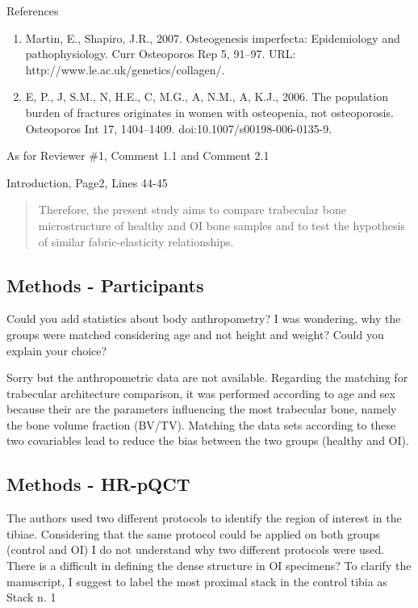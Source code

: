 \documentclass{AR2RC}
\begin{document}
References\vspace{-1em}
\begin{enumerate}
	\item Martin, E., Shapiro, J.R., 2007. Osteogenesis imperfecta: Epidemiology and pathophysiology. Curr Osteoporos Rep 5, 91–97. URL: http://www.le.ac.uk/genetics/collagen/.
	\item E, P., J, S.M., N, H.E., C, M.G., A, N.M., A, K.J., 2006. The population burden of fractures originates in women with osteopenia, not osteoporosis. Osteoporos Int 17, 1404–1409. doi:10.1007/s00198-006-0135-9.
\end{enumerate}

As for Reviewer \#1, Comment 1.1 and Comment 2.1\par

Introduction, Page2, Lines 44-45
\begin{quote}
	Therefore, the present study aims to compare trabecular bone microstructure of healthy and OI bone samples and to test the hypothesis of similar fabric-elasticity relationships.
\end{quote}


\subsection{Methods - Participants}
\RC Could you add statistics about body anthropometry? I was wondering, why the groups were matched considering age and not height and weight? Could you explain your choice?

\AR Sorry but the anthropometric data are not available. Regarding the matching for trabecular architecture comparison, it was performed according to age and sex because their are the parameters influencing the most trabecular bone, namely the bone volume fraction (BV/TV). Matching the data sets according to these two covariables lead to reduce the bias between the two groups (healthy and OI).

\subsection{Methods - HR-pQCT}
\RC The authors used two different protocols to identify the region of interest in the tibiae. Considering that the same protocol could be applied on both groups (control and OI) I do not understand why two different protocols were used. There is a difficult in defining the dense structure in OI specimens? To clarify the manuscript, I suggest to label the most proximal stack in the control tibia as Stack n. 1
\end{document}
